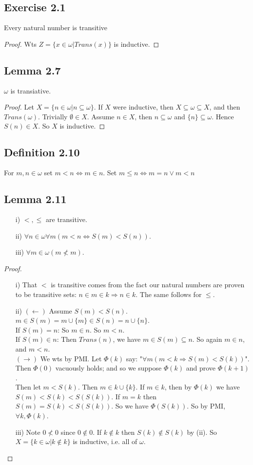 \documentclass[a4paper, 12pt, twoside]{article}
\begin{document}
\subsection*{Exercise 2.1}
Every natural number is transitive
\begin{proof}
    Wts $Z=\{x\in\omega|Trans(x)\}$ is inductive.
\end{proof}
\subsection*{Lemma 2.7}
$\omega$ is transiative.
\begin{proof}
    Let $X=\{n\in\omega|n\subseteq\omega\}$. If $X$ were inductive, then $X\subseteq\omega\subseteq X$, and then $Trans(\omega)$. Trivially $\emptyset\in X$. Assume $n\in X$, then $n\subseteq \omega$ and $\{n\}\subseteq\omega$. Hence $S(n)\in X$. So $X$ is inductive.
\end{proof}
\subsection*{Definition 2.10}
For $m,n\in\omega$ set $m<n\iff m\in n$. Set $m\leq n \iff m=n\vee m<n$
\subsection*{Lemma 2.11}
\begin{itemize}
    \item[i)] $<, \leq$ are transitive.
    \item[ii)] $\forall n\in\omega \forall m(m<n\iff S(m)<S(n))$.
    \item[iii)] $\forall m\in\omega(m\not<m)$.
\end{itemize}
\begin{proof}
    \begin{itemize}
        \item[i)] That $<$ is transitive comes from the fact our natural numbers are proven to be transitive sets: $n\in m\in k\Rightarrow n\in k$. The same follows for $\leq$.
        \item[ii)] $(\leftarrow)$ Assume $S(m)<S(n)$. $m\in S(m)=m\cup\{m\}\in S(n)=n\cup\{n\}$.\\
        If $S(m)=n$: So $m\in n$. So $m<n$.\\
        If $S(m)\in n$: Then $Trans(n)$, we have $m\in S(m)\subseteq n$. So again $m\in n$, and $m<n$.\\
        $(\rightarrow)$ We wts by PMI. Let $\Phi(k)$ say: "$\forall m(m<k\Rightarrow S(m)<S(k))$". Then $\Phi(0)$ vacuously holds; and so we suppose $\Phi(k)$ and prove $\Phi(k+1)$.\\
        Then let $m<S(k)$. Then $m\in k\cup\{k\}$. If $m\in k$, then by $\Phi(k)$ we have $S(m)<S(k)<S(S(k))$. If $m=k$ then $S(m)=S(k)<S(S(k))$. So we have $\Phi(S(k))$. So by PMI, $\forall k, \Phi(k)$.
        \item[iii)] Note $0\not<0$ since $0\not\in 0$. If $k\not\in k$ then $S(k)\not\in S(k)$ by (ii). So $X=\{k\in \omega|k\not\in k\}$ is inductive, i.e. all of $\omega$.
    \end{itemize}
\end{proof}
\end{document}
